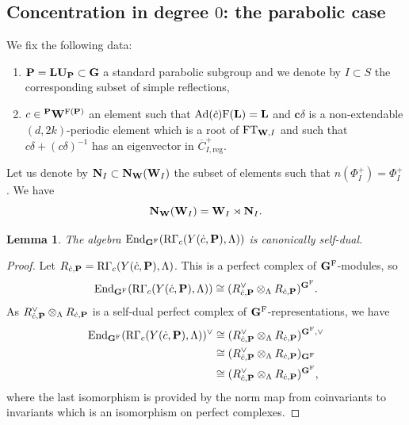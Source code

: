 \documentclass[article, 10pt, oneside, reqno]{amsart}
\theoremstyle{plain}
\newtheorem{lem}[thm]{Lemma}
\theoremstyle{definition}
\theoremstyle{remark}
\newcommand{\FT}{\mathrm{FT}}
\newcommand{\reg}{\mathrm{reg}}
\newcommand{\cbf}{\mathbf{c}}
\begin{document}
\subsection{Concentration in degree $0$: the parabolic case}

We fix the following data: 
\begin{enumerate}
\item $\mathbf{P} = \mathbf{L}\mathbf{U}_{\mathbf{P}} \subset \mathbf{G}$ a standard parabolic subgroup and we denote by $I \subset S$ the corresponding subset of simple reflections, 
\item $c \in {^{\mathbf{P}}}\mathbf{W}^{\mathrm{F}(\mathbf{P})}$ an element such that $\mathrm{Ad}(\dot{c})\mathrm{F}(\mathbf{L}) = \mathbf{L}$ and $\cbf\delta$ is a non-extendable $(d,2k)$-periodic element which is a root of $\FT_{\Wbf, I}$ and such that $c\delta + (c\delta)^{-1}$ has an eigenvector in $\overline{C}^+_{I,\reg}$.
\end{enumerate}

Let us denote by $\mathbf{N}_{I} \subset \mathbf{N}_{\mathbf{W}}(\mathbf{W}_I)$ the subset of elements such that $n(\Phi_I^+) = \Phi_I^+$. We have 
$$\mathbf{N}_{\mathbf{W}}(\mathbf{W}_{I}) = \mathbf{W}_{I} \rtimes \mathbf{N}_I.$$

\begin{lem}\label{lem:self-duality}
The algebra $\mathrm{End}_{\mathbf{G}^{\mathrm{F}}}(\mathrm{R\Gamma}_c(Y(\dot{c}, \mathbf{P}), \Lambda))$ is canonically self-dual.
\end{lem}

\begin{proof}
Let $R_{\dot{c}, \mathbf{P}} = \mathrm{R\Gamma}_c(Y(\dot{c}, \mathbf{P}), \Lambda)$. This is a perfect complex of $\mathbf{G}^{\mathrm{F}}$-modules, so 
$$\mathrm{End}_{\mathbf{G}^{\mathrm{F}}}(\mathrm{R\Gamma}_c(Y(\dot{c}, \mathbf{P}), \Lambda)) \cong (R_{\dot{c}, \mathbf{P}}^{\vee} \otimes_{\Lambda} R_{\dot{c}, \mathbf{P}})^{\mathbf{G}^{\mathrm{F}}}.$$
As $R_{\dot{c}, \mathbf{P}}^{\vee} \otimes_{\Lambda} R_{\dot{c}, \mathbf{P}}$ is a self-dual perfect complex of $\mathbf{G}^{\mathrm{F}}$-representations, we have 
\begin{align*}
\mathrm{End}_{\mathbf{G}^{\mathrm{F}}}(\mathrm{R\Gamma}_c(Y(\dot{c}, \mathbf{P}), \Lambda))^{\vee} &\cong (R_{\dot{c}, \mathbf{P}}^{\vee} \otimes_{\Lambda} R_{\dot{c}, \mathbf{P}})^{\mathbf{G}^{\mathrm{F}}, \vee} \\
&\cong (R_{\dot{c}, \mathbf{P}}^{\vee} \otimes_{\Lambda} R_{\dot{c}, \mathbf{P}})_{\mathbf{G}^{\mathrm{F}}} \\
&\cong (R_{\dot{c}, \mathbf{P}}^{\vee} \otimes_{\Lambda} R_{\dot{c}, \mathbf{P}})^{\mathbf{G}^{\mathrm{F}}},
\end{align*}
where the last isomorphism is provided by the norm map from coinvariants to invariants which is an isomorphism on perfect complexes.
\end{proof}
\end{document}
